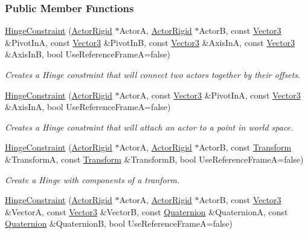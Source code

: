 \subsubsection*{Public Member Functions}
\begin{DoxyCompactItemize}
\item 
\hyperlink{classMezzanine_1_1HingeConstraint_a65d04021f0ac11d284de975d7552012e}{HingeConstraint} (\hyperlink{classMezzanine_1_1ActorRigid}{ActorRigid} $\ast$ActorA, \hyperlink{classMezzanine_1_1ActorRigid}{ActorRigid} $\ast$ActorB, const \hyperlink{classMezzanine_1_1Vector3}{Vector3} \&PivotInA, const \hyperlink{classMezzanine_1_1Vector3}{Vector3} \&PivotInB, const \hyperlink{classMezzanine_1_1Vector3}{Vector3} \&AxisInA, const \hyperlink{classMezzanine_1_1Vector3}{Vector3} \&AxisInB, bool UseReferenceFrameA=false)
\begin{DoxyCompactList}\small\item\em Creates a Hinge constraint that will connect two actors together by their offsets. \item\end{DoxyCompactList}\item 
\hyperlink{classMezzanine_1_1HingeConstraint_acb7f380b212a396b92d78ac055c55a68}{HingeConstraint} (\hyperlink{classMezzanine_1_1ActorRigid}{ActorRigid} $\ast$ActorA, const \hyperlink{classMezzanine_1_1Vector3}{Vector3} \&PivotInA, const \hyperlink{classMezzanine_1_1Vector3}{Vector3} \&AxisInA, bool UseReferenceFrameA=false)
\begin{DoxyCompactList}\small\item\em Creates a Hinge constraint that will attach an actor to a point in world space. \item\end{DoxyCompactList}\item 
\hyperlink{classMezzanine_1_1HingeConstraint_af769aacbd1756b528fe8724ecf5fc654}{HingeConstraint} (\hyperlink{classMezzanine_1_1ActorRigid}{ActorRigid} $\ast$ActorA, \hyperlink{classMezzanine_1_1ActorRigid}{ActorRigid} $\ast$ActorB, const \hyperlink{classMezzanine_1_1Transform}{Transform} \&TransformA, const \hyperlink{classMezzanine_1_1Transform}{Transform} \&TransformB, bool UseReferenceFrameA=false)
\begin{DoxyCompactList}\small\item\em Create a Hinge with components of a tranform. \item\end{DoxyCompactList}\item 
\hyperlink{classMezzanine_1_1HingeConstraint_a62a733c3ad51d3e7c5f51ae5a8adadd0}{HingeConstraint} (\hyperlink{classMezzanine_1_1ActorRigid}{ActorRigid} $\ast$ActorA, \hyperlink{classMezzanine_1_1ActorRigid}{ActorRigid} $\ast$ActorB, const \hyperlink{classMezzanine_1_1Vector3}{Vector3} \&VectorA, const \hyperlink{classMezzanine_1_1Vector3}{Vector3} \&VectorB, const \hyperlink{classMezzanine_1_1Quaternion}{Quaternion} \&QuaternionA, const \hyperlink{classMezzanine_1_1Quaternion}{Quaternion} \&QuaternionB, bool UseReferenceFrameA=false)

\end{DoxyCompactItemize}
